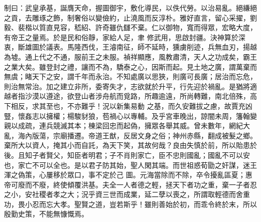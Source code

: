 \begin{pinyinscope}
 制曰：武皇承基，誕膺天命，握圖御宇，敷化導民，以佚代勞。以治易亂。絕縑絕之貢，去雕琢之飾，制奢俗以變儉約，止澆風而反淳朴。雅好直言，留心采擢，劉毅、裴楷以質直見容，嵇紹、許奇雖仇讎不棄。仁以御物，寬而得眾，宏略大度，有帝王之量焉。於是民和俗靜，家給人足，聿
 修武用，思啟封疆。決神算於深衷，斷雄圖於議表。馬隆西伐，王濬南征，師不延時，獯虜削迹，兵無血刃，揚越為墟。通上代之不通，服前王之未服。禎祥顯應，風教肅清，天人之功成矣，霸王之業大矣。雖登封之禮，讓而不為，驕泰之心，因斯而起。見土地之廣，謂萬棄而無虞；睹天下之安，謂千年而永治。不知處廣以思狹，則廣可長廣；居治而忘危，則治無常治。加之建立非所，委寄失才，志欲就於升平，行先迎於禍亂。是猶將適越者指沙漠以遵途，欲登山者涉舟航而覓路，所趣逾遠，所尚轉難，南北倍殊，高下相反，求其至也，不亦難乎！況以新集易動
 之基，而久安難拔之慮，故賈充凶豎，懷姦志以擁權；楊駿豺狼，苞禍心以專輔。及乎宮車晚出，諒闇未周，籓翰變親以成疏，連兵競滅其本；棟梁回忠而起偽，擁眾各舉其威。曾未數年，網紀大亂，海內版蕩，宗廟播遷。帝道王猷，反居文身之俗；神州赤縣，翻成被髮之鄉。棄所大以資人，掩其小而自託，為天下笑，其故何哉？良由失慎於前，所以貽患於後。且知子者賢父，知臣者明君；子不肖則家亡，臣不忠則國亂；國亂不可以安也，家亡不可以全也。是以君子防其始，聖人閑其端。而世祖惑荀勖之奸謀，迷王渾之偽策，心屢移於眾口，事不定於己
 圖。元海當除而不除，卒令擾亂區夏；惠帝可廢而不廢，終使傾覆洪基。夫全一人者德之輕，拯天下者功之重，棄一子者忍之小，安社稷者孝之大；況乎資三世而成業，延二孽以喪之，所謂取輕德而舍重功，畏小忍而忘大孝。聖賢之道，豈若斯乎！雖則善始於初，而乖令終於末，所以殷勤史策，不能無慷慨焉。



\end{pinyinscope}
